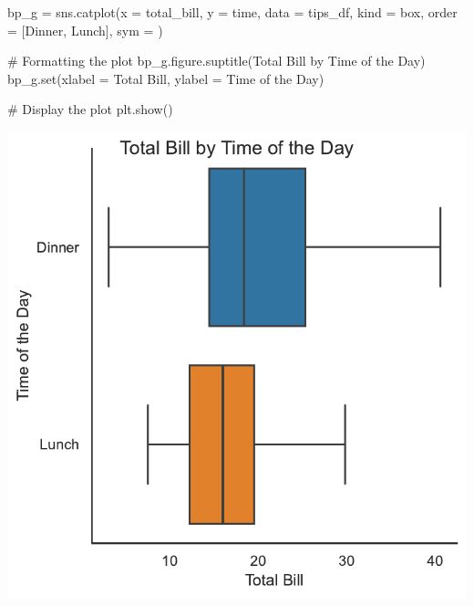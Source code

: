\documentclass[
  letterpaper,
  DIV=11,
  numbers=noendperiod]{scrartcl}
\newenvironment{Shaded}{\begin{snugshade}}{\end{snugshade}}
\newcommand{\BuiltInTok}[1]{\textcolor[rgb]{0.00,0.46,0.62}{#1}}
\newcommand{\CommentTok}[1]{\textcolor[rgb]{0.37,0.37,0.37}{#1}}
\newcommand{\NormalTok}[1]{\textcolor[rgb]{0.00,0.46,0.62}{#1}}
\newcommand{\OperatorTok}[1]{\textcolor[rgb]{0.37,0.37,0.37}{#1}}
\newcommand{\StringTok}[1]{\textcolor[rgb]{0.13,0.47,0.30}{#1}}
\begin{document}
\begin{Shaded}
\begin{Highlighting}[]
\NormalTok{bp\_g }\OperatorTok{=}\NormalTok{ sns.catplot(x }\OperatorTok{=} \StringTok{\textquotesingle{}total\_bill\textquotesingle{}}\NormalTok{,}
\NormalTok{                   y }\OperatorTok{=} \StringTok{\textquotesingle{}time\textquotesingle{}}\NormalTok{,}
\NormalTok{                   data }\OperatorTok{=}\NormalTok{ tips\_df,}
\NormalTok{                   kind }\OperatorTok{=} \StringTok{\textquotesingle{}box\textquotesingle{}}\NormalTok{,}
\NormalTok{                   order }\OperatorTok{=}\NormalTok{ [}\StringTok{\textquotesingle{}Dinner\textquotesingle{}}\NormalTok{, }\StringTok{\textquotesingle{}Lunch\textquotesingle{}}\NormalTok{],}
\NormalTok{                   sym }\OperatorTok{=} \StringTok{\textquotesingle{}\textquotesingle{}}
\NormalTok{                  )}

\CommentTok{\# Formatting the plot}
\NormalTok{bp\_g.figure.suptitle(}\StringTok{\textquotesingle{}Total Bill by Time of the Day\textquotesingle{}}\NormalTok{)}
\NormalTok{bp\_g.}\BuiltInTok{set}\NormalTok{(xlabel }\OperatorTok{=} \StringTok{\textquotesingle{}Total Bill\textquotesingle{}}\NormalTok{,}
\NormalTok{          ylabel }\OperatorTok{=} \StringTok{\textquotesingle{}Time of the Day\textquotesingle{}}\NormalTok{)}
          
\CommentTok{\# Display the plot}
\NormalTok{plt.show()}
\end{Highlighting}
\end{Shaded}

\includegraphics{data_visualization_with_seaborn_files/figure-pdf/cell-17-output-1.pdf}
\end{document}
